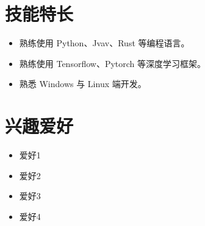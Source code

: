 \documentclass[11pt]{article}
\newlength{\iconwidth}
\begin{document}
    \begin{minipage}[t]{0.6\textwidth}
        \section[技能特长]{\makebox[\iconwidth][c]{\color{primary_color}{\faWrench}}\quad 技能特长}
        \begin{itemize}
        \setlength{\itemsep}{0.5em}
            \item 熟练使用 Python、Jvav、Rust 等编程语言。
            \item 熟练使用 Tensorflow、Pytorch 等深度学习框架。
            \item 熟悉 Windows 与 Linux 端开发。
        \end{itemize}
    \end{minipage}
    \hfill
    \begin{minipage}[t]{0.35\textwidth}
        \section[兴趣爱好]{\makebox[\iconwidth][c]{\color{primary_color}{\faStar}}\quad 兴趣爱好}
        \begin{itemize}
        \setlength{\itemsep}{0.5em}
            \item 爱好1
            \item 爱好2
            \item 爱好3
            \item 爱好4
        \end{itemize}
    \end{minipage}


\end{document}
